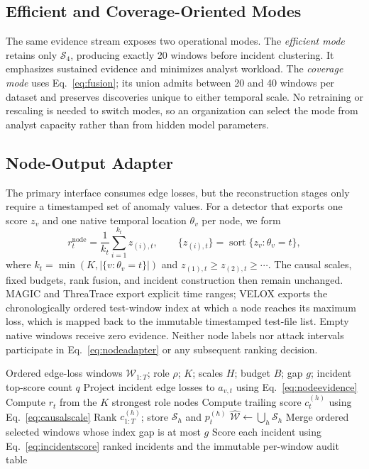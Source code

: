 \documentclass[lettersize,journal]{IEEEtran}
\begin{document}
\subsection{Efficient and Coverage-Oriented Modes}

The same evidence stream exposes two operational modes.  The \emph{efficient
mode} retains only $\mathcal S_4$, producing exactly 20 windows before incident
clustering.  It emphasizes sustained evidence and minimizes analyst workload.
The \emph{coverage mode} uses Eq.~\eqref{eq:fusion}; its union admits between 20
and 40 windows per dataset and preserves discoveries unique to either temporal
scale.  No retraining or rescaling is needed to switch modes, so an organization
can select the mode from analyst capacity rather than from hidden model
parameters.

\subsection{Node-Output Adapter}

The primary interface consumes edge losses, but the reconstruction stages only
require a timestamped set of anomaly values.  For a detector that exports one
score $z_v$ and one native temporal location $\theta_v$ per node, we form
\begin{equation}
 r_t^{\mathrm{node}}=\frac{1}{k_t}
 \sum_{i=1}^{k_t} z_{(i),t},\qquad
 \{z_{(i),t}\}=\operatorname{sort}\{z_v:\theta_v=t\},
 \label{eq:nodeadapter}
\end{equation}
where $k_t=\min(K,|\{v:\theta_v=t\}|)$ and
$z_{(1),t}\geq z_{(2),t}\geq\cdots$.  The causal scales, fixed budgets,
rank fusion, and incident construction then remain unchanged.  MAGIC and
ThreaTrace export explicit time ranges; VELOX exports the chronologically
ordered test-window index at which a node reaches its maximum loss, which is
mapped back to the immutable timestamped test-file list.  Empty native windows
receive zero evidence.  Neither node labels nor attack intervals participate in
Eq.~\eqref{eq:nodeadapter} or any subsequent ranking decision.

\begin{algorithm}[!t]
\caption{Causal Multiscale Incident Reconstruction over a Closed Review Horizon}
\label{alg:cmir}
\begin{algorithmic}[1]
\REQUIRE Ordered edge-loss windows $\mathcal{W}_{1:T}$; role $\rho$; $K$;
scales $H$; budget $B$; gap $g$; incident top-score count $q$
  \STATE Project incident edge losses to $a_{v,t}$ using Eq.~\eqref{eq:nodeevidence}
  \STATE Compute $r_t$ from the $K$ strongest role nodes
    \STATE Compute trailing score $c_t^{(h)}$ using Eq.~\eqref{eq:causalscale}
  \ENDFOR
\ENDFOR
{}
  \STATE Rank $c_{1:T}^{(h)}$; store $\mathcal S_h$ and $p_t^{(h)}$
\ENDFOR
\STATE $\widehat{\mathcal W}\leftarrow\bigcup_h\mathcal S_h$
\STATE Merge ordered selected windows whose index gap is at most $g$
\STATE Score each incident using Eq.~\eqref{eq:incidentscore}
\RETURN ranked incidents and the immutable per-window audit table
\end{algorithmic}
\end{algorithm}
\end{document}

